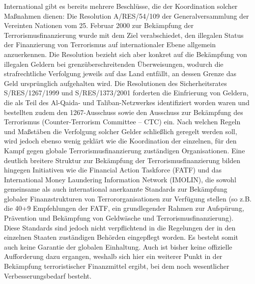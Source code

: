 \documentclass[a4paper,11pt]{article}
\begin{document}
International gibt es bereits mehrere Beschlüsse, die der Koordination solcher Maßnahmen dienen: Die Resolution A/RES/54/109 der Generalversammlung der Vereinten Nationen vom 25. Februar 2000 zur Bekämpfung der Terrorismusfinanzierung wurde mit dem Ziel verabschiedet, den illegalen Status der Finanzierung von Terrorismus auf internationaler Ebene allgemein anzuerkennen. Die Resolution bezieht sich aber konkret auf die Bekämpfung von illegalen Geldern bei grenzüberschreitenden Überweisungen, wodurch die strafrechtliche Verfolgung jeweils auf das Land entfällt, an dessen Grenze das Geld ursprünglich aufgehalten wird. Die Resolutionen des Sicherheitsrates S/RES/1267/1999 und S/RES/1373/2001 forderten die Einfrierung von Geldern, die als Teil des Al-Qaida- und Taliban-Netzwerkes identifiziert worden waren und bestellten zudem den 1267-Ausschuss sowie den Ausschuss zur Bekämpfung des Terrorismus (Counter-Terrorism Committee – CTC) ein. Nach welchen Regeln und Maßstäben die Verfolgung solcher Gelder schließlich geregelt werden soll, wird jedoch ebenso wenig geklärt wie die Koordination der einzelnen, für den Kampf gegen globale Terrorismusfinanzierung zuständigen Organisationen. Eine deutlich breitere Struktur zur Bekämpfung der Terrorismusfinanzierung bilden hingegen Initiativen wie die Financial Action Taskforce (FATF) und das International Money Laundering Information Network (IMOLIN), die sowohl gemeinsame als auch international anerkannte Standards zur Bekämpfung globaler Finanzstrukturen von Terrororganisationen zur Verfügung stellen (so z.B. die 40+9 Empfehlungen der FATF, ein grundlegender Rahmen zur Aufspürung, Prävention und Bekämpfung von Geldwäsche und Terrorismusfinanzierung). Diese Standards sind jedoch nicht verpflichtend in die Regelungen der in den einzelnen Staaten zuständigen Behörden eingepflegt worden. Es besteht somit auch keine Garantie der globalen Einhaltung. Auch ist bisher keine offizielle Aufforderung dazu ergangen, weshalb sich hier ein weiterer Punkt in der Bekämpfung terroristischer Finanzmittel ergibt, bei dem noch wesentlicher Verbesserungsbedarf besteht. 
\end{document}
